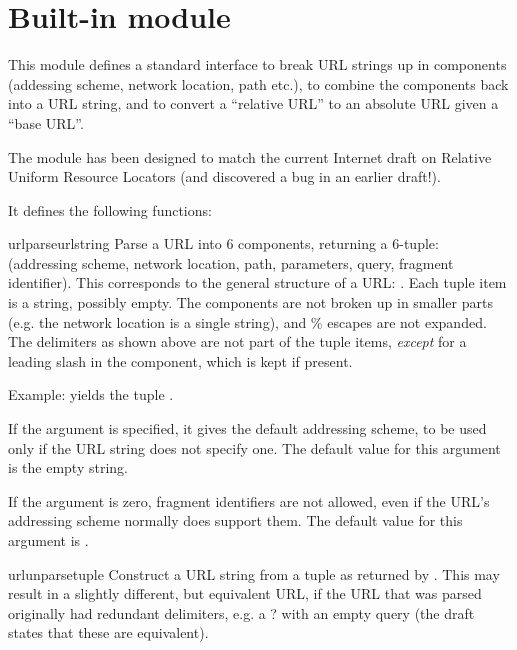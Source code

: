 \section{Built-in module }

\renewcommand{\indexsubitem}{(in module urlparse)}

This module defines a standard interface to break URL strings up in
components (addessing scheme, network location, path etc.), to combine
the components back into a URL string, and to convert a ``relative
URL'' to an absolute URL given a ``base URL''.

The module has been designed to match the current Internet draft on
Relative Uniform Resource Locators (and discovered a bug in an earlier
draft!).

It defines the following functions:

\begin{funcdesc}{urlparse}{urlstring}
Parse a URL into 6 components, returning a 6-tuple: (addressing
scheme, network location, path, parameters, query, fragment
identifier).  This corresponds to the general structure of a URL:
.
Each tuple item is a string, possibly empty.
The components are not broken up in smaller parts (e.g. the network
location is a single string), and \% escapes are not expanded.
The delimiters as shown above are not part of the tuple items, {\em
except} for a leading slash in the  component, which is
kept if present.

Example:
yields the tuple
.

If the  argument is specified, it gives the
default addressing scheme, to be used only if the URL string does not
specify one.  The default value for this argument is the empty string.

If the  argument is zero, fragment identifiers
are not allowed, even if the URL's addressing scheme normally does
support them.  The default value for this argument is .
\end{funcdesc}

\begin{funcdesc}{urlunparse}{tuple}
Construct a URL string from a tuple as returned by .
This may result in a slightly different, but equivalent URL, if the
URL that was parsed originally had redundant delimiters, e.g. a ? with
an empty query (the draft states that these are equivalent).
\end{funcdesc}

